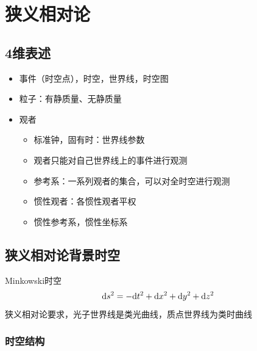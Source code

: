 \chapter{狭义相对论}

\section{4维表述}

\begin{itemize}
    \item 事件（时空点），时空，世界线，时空图
    \item 粒子：有静质量、无静质量
    \item 观者
    \begin{itemize}
        \item 标准钟，固有时：世界线参数
        \item 观者只能对自己世界线上的事件进行观测
        \item 参考系：一系列观者的集合，可以对全时空进行观测
        \item 惯性观者：各惯性观者平权
        \item 惯性参考系，惯性坐标系
    \end{itemize}
\end{itemize}

\section{狭义相对论背景时空}

Minkowski时空
\begin{gather*}
    \mathrm{d} s^2=-\mathrm{d} t^2 + \mathrm{d} x^2 + \mathrm{d} y^2 + \mathrm{d} z^2
\end{gather*}
狭义相对论要求，光子世界线是类光曲线，质点世界线为类时曲线

\subsection{时空结构}

